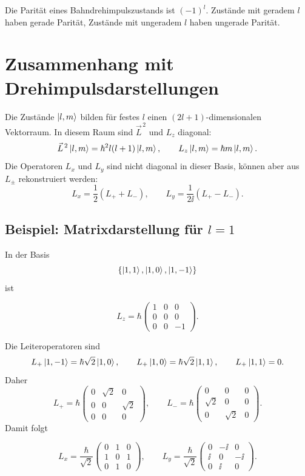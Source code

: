 \begin{conceptbox}
Die Parität eines Bahndrehimpulszustands ist \((-1)^l\). Zustände mit geradem \(l\) haben gerade Parität, Zustände mit ungeradem \(l\) haben ungerade Parität.
\end{conceptbox}

\section{Zusammenhang mit Drehimpulsdarstellungen}

Die Zustände \(\left|l,m\right\rangle\) bilden für festes \(l\) einen \((2l+1)\)-dimensionalen Vektorraum. In diesem Raum sind \(\vec L^{\,2}\) und \(L_z\) diagonal:
\[
    \vec L^{\,2}\left|l,m\right\rangle=\hbar^2l(l+1)\left|l,m\right\rangle,
    \qquad
    L_z\left|l,m\right\rangle=\hbar m\left|l,m\right\rangle.
\]
Die Operatoren \(L_x\) und \(L_y\) sind nicht diagonal in dieser Basis, können aber aus \(L_\pm\) rekonstruiert werden:
\[
    L_x=\frac12(L_++L_-),
    \qquad
    L_y=\frac{1}{2\ii}(L_+-L_-).
\]

\subsection{Beispiel: Matrixdarstellung für \(l=1\)}

In der Basis
\[
    \{\left|1,1\right\rangle,\left|1,0\right\rangle,\left|1,-1\right\rangle\}
\]
ist
\begin{formulabox}
\[
    L_z=\hbar
    \begin{pmatrix}
        1&0&0\\
        0&0&0\\
        0&0&-1
    \end{pmatrix}.
\]
\end{formulabox}

Die Leiteroperatoren sind
\[
    L_+\left|1,-1\right\rangle=\hbar\sqrt2\left|1,0\right\rangle,
    \qquad
    L_+\left|1,0\right\rangle=\hbar\sqrt2\left|1,1\right\rangle,
    \qquad
    L_+\left|1,1\right\rangle=0.
\]
Daher
\[
    L_+=\hbar
    \begin{pmatrix}
        0&\sqrt2&0\\
        0&0&\sqrt2\\
        0&0&0
    \end{pmatrix},
    \qquad
    L_-=\hbar
    \begin{pmatrix}
        0&0&0\\
        \sqrt2&0&0\\
        0&\sqrt2&0
    \end{pmatrix}.
\]
Damit folgt
\begin{formulabox}
\[
    L_x=\frac{\hbar}{\sqrt2}
    \begin{pmatrix}
        0&1&0\\
        1&0&1\\
        0&1&0
    \end{pmatrix},
    \qquad
    L_y=\frac{\hbar}{\sqrt2}
    \begin{pmatrix}
        0&-\ii&0\\
        \ii&0&-\ii\\
        0&\ii&0
    \end{pmatrix}.
\]
\end{formulabox}

